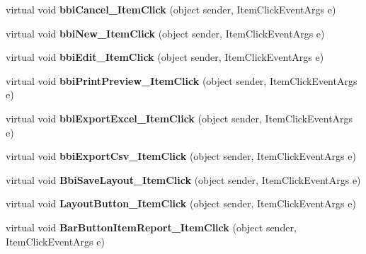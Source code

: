 \begin{DoxyCompactItemize}
virtual void {\bfseries bbi\+Cancel\+\_\+\+Item\+Click} (object sender, Item\+Click\+Event\+Args e)
\item 
\mbox{\label{class_h_k_supply_1_1_forms_1_1_ribbon_form_base_ad57212705cc492e7a8b25c1ee65de37a}} 
virtual void {\bfseries bbi\+New\+\_\+\+Item\+Click} (object sender, Item\+Click\+Event\+Args e)
\item 
\mbox{\label{class_h_k_supply_1_1_forms_1_1_ribbon_form_base_af810662672614a80a41f09f0dadcbee3}} 
virtual void {\bfseries bbi\+Edit\+\_\+\+Item\+Click} (object sender, Item\+Click\+Event\+Args e)
\item 
\mbox{\label{class_h_k_supply_1_1_forms_1_1_ribbon_form_base_a3261a304d32dac9f2d658eb430528f61}} 
virtual void {\bfseries bbi\+Print\+Preview\+\_\+\+Item\+Click} (object sender, Item\+Click\+Event\+Args e)
\item 
\mbox{\label{class_h_k_supply_1_1_forms_1_1_ribbon_form_base_ac5b520f58dbca59a2bffb6cb7ca51811}} 
virtual void {\bfseries bbi\+Export\+Excel\+\_\+\+Item\+Click} (object sender, Item\+Click\+Event\+Args e)
\item 
\mbox{\label{class_h_k_supply_1_1_forms_1_1_ribbon_form_base_a1cb63ed00f841e9a3ad90de4bf48912a}} 
virtual void {\bfseries bbi\+Export\+Csv\+\_\+\+Item\+Click} (object sender, Item\+Click\+Event\+Args e)
\item 
\mbox{\label{class_h_k_supply_1_1_forms_1_1_ribbon_form_base_a0d67163f46c55b3dd2203591b18f1e58}} 
virtual void {\bfseries Bbi\+Save\+Layout\+\_\+\+Item\+Click} (object sender, Item\+Click\+Event\+Args e)
\item 
\mbox{\label{class_h_k_supply_1_1_forms_1_1_ribbon_form_base_af6655859725d01e608331026f38a160d}} 
virtual void {\bfseries Layout\+Button\+\_\+\+Item\+Click} (object sender, Item\+Click\+Event\+Args e)
\item 
\mbox{\label{class_h_k_supply_1_1_forms_1_1_ribbon_form_base_afc105d49fb2be36f7ecaac564c71c34f}} 
virtual void {\bfseries Bar\+Button\+Item\+Report\+\_\+\+Item\+Click} (object sender, Item\+Click\+Event\+Args e)
\end{DoxyCompactItemize}
